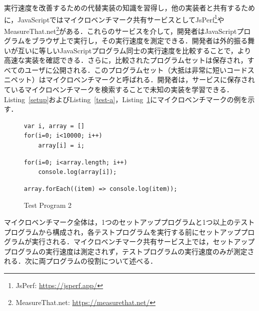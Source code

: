 \documentclass[submit,techrep,noauthor]{ipsj}
\newcommand{\todo}[1]{\colorbox{yellow}{{\bf TODO}:}{\color{red} {\textbf{[#1]}}}}
\begin{document}
実行速度を改善するための代替実装の知識を習得し，他の実装者と共有するために，JavaScriptではマイクロベンチマーク共有サービスとしてJsPerf\footnote{JsPerf: \url{https://jsperf.app/}}やMeasureThat.net\footnote{MeasureThat.net: \url{https://measurethat.net/}}がある．これらのサービスを介して，開発者はJavaScriptプログラムをブラウザ上で実行し，その実行速度を測定できる．開発者は外的振る舞いが互いに等しいJavaScriptプログラム同士の実行速度を比較することで，より高速な実装を確認できる．さらに，比較されたプログラムセットは保存され，すべてのユーザに公開される．このプログラムセット（大抵は非常に短いコードスニペット）はマイクロベンチマークと呼ばれる．開発者は，サービスに保存されているマイクロベンチマークを検索することで未知の実装を学習できる．Listing~\ref{setup}およびListing~\ref{test-a}，Listing~\ref{test-b}にマイクロベンチマークの例を示す．%

\begin{figure}[t]
\captionsetup{name=Listing}
  \caption{Setup}\label{setup}
\begin{lstlisting}
var i, array = []
for(i=0; i<10000; i++)
    array[i] = i;
\end{lstlisting}
  \begin{minipage}[b]{0.48\linewidth}
  \caption{Test Program 1}\label{test-a}
\begin{lstlisting}[firstnumber=4]
for(i=0; i<array.length; i++)
    console.log(array[i]);
\end{lstlisting}
  \end{minipage}
    \hspace{0.07\columnwidth} %
  \begin{minipage}[b]{0.48\linewidth}
    \caption{Test Program 2}\label{test-b}
\begin{lstlisting}[firstnumber=4]
array.forEach((item) => console.log(item));
\end{lstlisting}
  \vspace{3.5mm}
  \end{minipage}
\end{figure}

マイクロベンチマーク全体は，1つのセットアッププログラムと1つ以上のテストプログラムから構成され，各テストプログラムを実行する前にセットアッププログラムが実行される．マイクロベンチマーク共有サービス上では，セットアッププログラムの実行速度は測定されず，テストプログラムの実行速度のみが測定される．次に両プログラムの役割について述べる．
\end{document}
